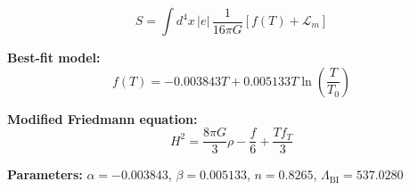 
\begin{equation}
  S = \int d^4x \, |e| \, \frac{1}{16\pi G} \left[ f(T) + \mathcal{L}_m \right]
\end{equation}

\textbf{Best-fit model:}
\begin{equation}
  f(T) = -0.003843 T + 0.005133 T \ln\!\left(\frac{T}{T_0}\right)
\end{equation}

\textbf{Modified Friedmann equation:}
\begin{equation}
  H^2 = \frac{8\pi G}{3} \rho - \frac{f}{6} + \frac{T f_T}{3}
\end{equation}

\textbf{Parameters:}
$\alpha = -0.003843$, \quad
$\beta = 0.005133$, \quad
$n = 0.8265$, \quad
$\Lambda_{\text{BI}} = 537.0280$